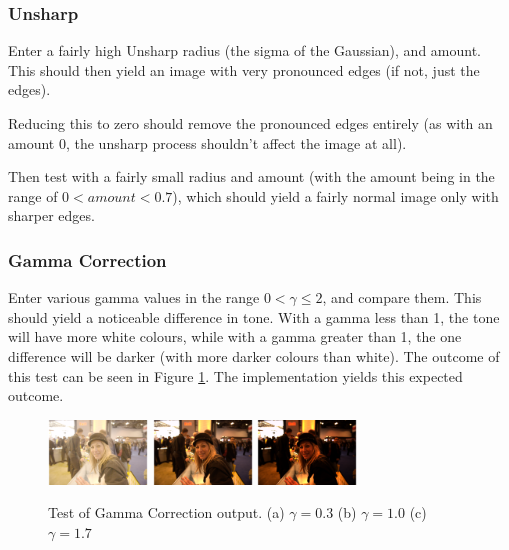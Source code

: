 \documentclass[10pt,a4paper]{article}
\begin{document}
\subsubsection{Unsharp}
Enter a fairly high Unsharp radius (the sigma of the Gaussian), and amount. This should then yield an image with very pronounced edges (if not, just the edges).

Reducing this to zero should remove the pronounced edges entirely (as with an amount 0, the unsharp process shouldn't affect the image at all).

Then test with a fairly small radius and amount (with the amount being in the range of $0 < amount < 0.7$), which should yield a fairly normal image only with sharper
edges.

\subsubsection{Gamma Correction}
Enter various gamma values in the range $0 < \gamma \leq 2$, and compare them. This should yield a noticeable difference in tone. With a gamma less than 1,
the tone will have more white colours, while with a gamma greater than 1, the one difference will be darker (with more darker colours than white). The
outcome of this test can be seen in Figure \ref{gammatest}. The implementation yields this expected outcome.

\begin{figure}\label{gammatest}
   \centering
   \subfigure
   {
       \includegraphics[width=100px]{gammacorrectionlow}
   }
   \subfigure
   {
       \includegraphics[width=100px]{gammacorrection_normal}
   }
   \subfigure
   {
       \includegraphics[width=100px]{gammacorrectionhigh}
   }
   \caption{
       Test of Gamma Correction output. 
       (a) $\gamma = 0.3$
       (b) $\gamma = 1.0$
       (c) $\gamma = 1.7$
   }
\end{figure}
\end{document}
